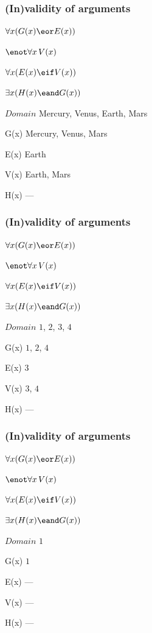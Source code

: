 \begin{frame}
  \frametitle{(In)validity of arguments}

\begin{earg}
\item[] $\forall x( G(x) \eor  E(x))$
\item[] $\enot \forall x\, V(x)$
\item[] $\forall x (E(x) \eif V(x))$
\item[\therefore] $\exists x (H(x) \eand G(x))$
\end{earg}

\begin{ekey}
\item[$Domain$] Mercury, Venus, Earth, Mars
\item[G(x)] Mercury, Venus, Mars
\item[E(x)] Earth
\item[V(x)] Earth, Mars
\item[H(x)] ---
\end{ekey}
\end{frame}

\begin{frame}
\frametitle{(In)validity of arguments}

\begin{earg}
\item[] $\forall x( G(x) \eor  E(x))$
\item[] $\enot \forall x\, V(x)$
\item[] $\forall x (E(x) \eif V(x))$
\item[\therefore] $\exists x (H(x) \eand G(x))$
\end{earg}

\begin{ekey}
\item[$Domain$] $1$, $2$, $3$, $4$
\item[G(x)] $1$, $2$, $4$
\item[E(x)] $3$
\item[V(x)] $3$, $4$
\item[H(x)] ---
\end{ekey}
\end{frame}

\begin{frame}
  \frametitle{(In)validity of arguments}
  
  \begin{earg}
  \item[] $\forall x( G(x) \eor  E(x))$
  \item[] $\enot \forall x\, V(x)$
  \item[] $\forall x (E(x) \eif V(x))$
  \item[\therefore] $\exists x (H(x) \eand G(x))$
  \end{earg}
  
  \begin{ekey}
  \item[$Domain$] $1$
  \item[G(x)] $1$
  \item[E(x)] ---
  \item[V(x)] ---
  \item[H(x)] ---
  \end{ekey}
  \end{frame}

